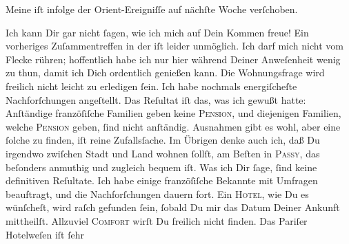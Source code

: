 \pstart
           Meine \label{K_L02805-3v}\label{K_L02805-3} iſt infolge der Orient-Ereigniſſe auf nächſte Woche verſchoben.\pend
           
\pstart
           {\pb}Ich kann Dir gar nicht{ }ſagen, wie ich mich auf Dein
               Kommen freue! Ein vorheriges Zuſammentreffen in der \label{K_L02805-4v}\label{K_L02805-4} iſt leider unmöglich. Ich darf mich nicht vom Flecke
               rühren; hoffentlich habe ich nur hier während Deiner Anweſenheit wenig zu thun, damit
               ich Dich ordentlich genießen kann. Die Wohnungsfrage wird freilich nicht leicht zu
               erledigen{ }ſein.  Ich habe nochmals energiſcheſte
               Nachforſchungen angeſtellt. Das Reſultat iſt das, was ich gewußt hatte: Anſtändige
                  franzöſiſche Familien geben
               keine \textsc{Pension}, und diejenigen Familien, welche \textsc{Pension} geben,{ }ſind nicht anſtändig. Ausnahmen gibt {\pb}es wohl, aber eine{ }ſolche zu finden, iſt reine
               Zufallsſache. Im Übrigen denke auch ich, daß Du irgendwo zwiſchen Stadt und Land
               wohnen{ }ſollſt, am Beſten in \textsc{Passy}, das beſonders anmuthig und zugleich bequem iſt. Was ich Dir{ }ſage,{ }ſind keine
               definitiven Reſultate. Ich habe einige franzöſiſche Bekannte mit Umfragen beauftragt, und die
               Nachforſchungen dauern fort. Ein \textsc{Hotel}, wie Du es
               wünſcheſt, wird raſch gefunden{ }ſein,{ }ſobald Du mir das Datum  Deiner Ankunft mittheilſt. Allzuviel \textsc{Comfort} wirſt Du freilich nicht finden. Das Pariſer {\pb}Hotelweſen iſt{ }ſehr
